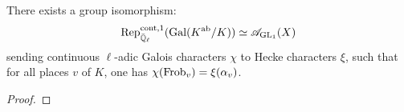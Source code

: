             \begin{theorem} \label{theorem: artin_reciprocity_for_global_function_fields}
                There exists a group isomorphism:
                    $$\mathrm{Rep}^{\mathrm{cont}, 1}_{\bar{\mathbb{Q}}_{\ell}}(\mathrm{Gal}(K^{\mathrm{ab}}/K)) \simeq \mathscr{A}_{\operatorname{GL}_1}(X)$$
                sending continuous $\ell$-adic Galois characters $\chi$ to Hecke characters $\xi$, such that for all places $v$ of $K$, one has $\chi(\mathrm{Frob}_v) = \xi(\alpha_v)$.
            \end{theorem}
                \begin{proof}
                    
                \end{proof}